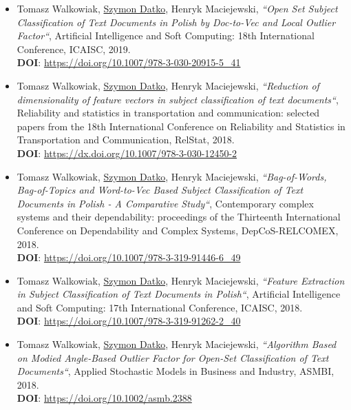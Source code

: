 \begin{itemize}
    \item
        Tomasz Walkowiak, \underline{Szymon Datko}, Henryk Maciejewski,
        \textit{“Open Set Subject Classification of Text Documents in Polish by Doc-to-Vec and Local Outlier Factor“},
        Artificial Intelligence and Soft Computing: 18th International Conference, ICAISC, 2019.\\
        \textbf{DOI}: \url{https://doi.org/10.1007/978-3-030-20915-5_41}

    \item
        Tomasz Walkowiak, \underline{Szymon Datko}, Henryk Maciejewski,
        \textit{“Reduction of dimensionality of feature vectors in subject classification of text documents“},
        Reliability and statistics in transportation and communication: selected papers from the 18th International Conference on Reliability and Statistics in Transportation and Communication, RelStat, 2018.\\
        \textbf{DOI}: \url{https://dx.doi.org/10.1007/978-3-030-12450-2}

    \item
        Tomasz Walkowiak, \underline{Szymon Datko}, Henryk Maciejewski,
        \textit{“Bag-of-Words, Bag-of-Topics and Word-to-Vec Based Subject Classification of Text Documents in Polish - A Comparative Study“},
        Contemporary complex systems and their dependability: proceedings of the Thirteenth International Conference on Dependability and Complex Systems, DepCoS-RELCOMEX, 2018.\\
        \textbf{DOI}: \url{https://doi.org/10.1007/978-3-319-91446-6_49}

    \item
        Tomasz Walkowiak, \underline{Szymon Datko}, Henryk Maciejewski,
        \textit{“Feature Extraction in Subject Classification of Text Documents in Polish“},
        Artificial Intelligence and Soft Computing: 17th International Conference, ICAISC, 2018.\\
        \textbf{DOI}: \url{https://doi.org/10.1007/978-3-319-91262-2_40}

    \item
        Tomasz Walkowiak, \underline{Szymon Datko}, Henryk Maciejewski,
        \textit{“Algorithm Based on Modied Angle-Based Outlier Factor for Open-Set Classification of Text Documents“},
        Applied Stochastic Models in Business and Industry, ASMBI, 2018.\\
        \textbf{DOI}: \url{https://doi.org/10.1002/asmb.2388}
\end{itemize}


